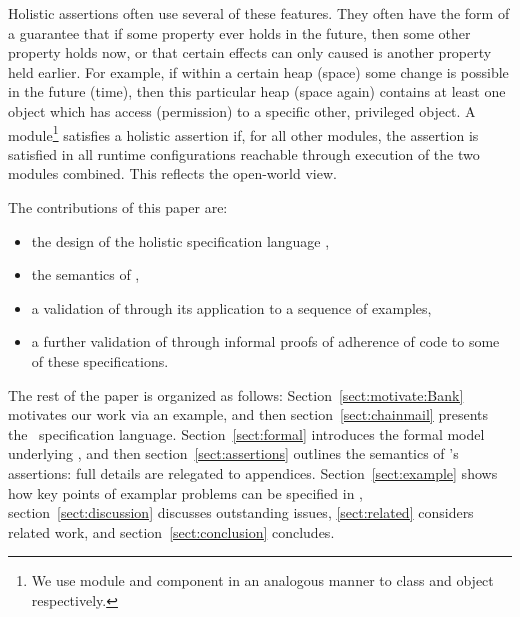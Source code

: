 Holistic assertions often use several of these features. They often have the form  of a guarantee
that if some property ever holds in the future, then some other property holds now, or that
certain effects can only caused is another property held earlier.
For example, if within a certain heap (space) some change is possible in the future (time), then this particular heap 
(space again) contains 
at least one object which has access (permission) to a specific other, privileged object.
A module\footnote{We use module and component in an analogous manner to class and object respectively.}
 satisfies a holistic assertion if, for all other modules,
  the assertion is satisfied  in all runtime configurations reachable through execution of the two modules combined.
  This reflects the open-world view.


The contributions of this paper are:
\begin{itemize}
\item the design of the holistic specification language \Chainmail,
\item the semantics of \Chainmail,
\item a validation of \Chainmail through its application to a sequence of examples,
\item a further validation of \Chainmail through informal proofs of adherence of code to some of these specifications.
\end{itemize}  
  
  
The rest of the paper is organized as follows: Section~\ref{sect:motivate:Bank} 
motivates our work via an example, and then
section~\ref{sect:chainmail} presents the \Chainmail\ specification
language.  Section~\ref{sect:formal} introduces the formal model
underlying \Chainmail, and then section~\ref{sect:assertions} outlines
the 
semantics of \Chainmail's assertions: full details are relegated to
appendices.   Section~\ref{sect:example} shows how key points of 
examplar problems can be specified in \Chainmail,
section~\ref{sect:discussion}
discusses outstanding issues, \ref{sect:related} considers related
work, and section~\ref{sect:conclusion} concludes.

